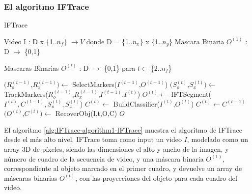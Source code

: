 \subsubsection{El algoritmo IFTrace}
\begin{algorithm}
    \caption{IFTrace}
    \label{alg:IFTrace-algorithm1-IFTrace}
    \begin{algorithmic}
        \Require\hspace{\algorithmicindent}\hspace{\algorithmicindent}Video I : D x \{1..$n_{f}$\} $\to V$
        \State\hspace{\algorithmicindent}\hspace{\algorithmicindent}\hspace{\algorithmicindent}\hspace{0.3cm}donde D = \{1..$n_{x}$\} x \{1..$n_{y}$\}
        \State\hspace{\algorithmicindent}\hspace{\algorithmicindent}\hspace{\algorithmicindent}\hspace{0.3cm}Mascara Binaria $O^{(1)}$ : D $\to$ \{0,1\}

        \Ensure \hspace{\algorithmicindent}\hspace{0.23cm} Mascaras Binarias $O^{(t)}$ : D $\to$ \{0,1\} para $t \in $ \{2..$n_f$\}
        \State

            \State $(R^{(t-1)}_{o}$,$R^{(t-1)}_{x}) \gets $  SelectMarkers($I^{(t-1)}$,$O^{(t-1)}$)
            \State $(S^{(t)}_{o}$,$S^{(t)}_{x}) \gets$  TrackMarkers($R^{(t-1)}_{o}$,$R^{(t-1)}_{x}$,$I^{(t-1)}$,$I^{(t)}$)
                \State $O^{(t)} \gets$  IFTSegment($I^{(t)}, C^{(t-1)}, S^{(t)}_{o}, S^{(t)}_{x}$)
                \State$C^{(t)} \gets$ BuildClassifier($I^{(t)}$,$O^{(t)}$)
            \Else
                \State $C^{(t)} \gets C^{(t-1)}$
                \State $(O^{(t)}$,$C^{(t)}) \gets$  RecoverObj(I,t,O,C)
            \EndIf\EndFor
        \State \Return $O$
    \end{algorithmic}
\end{algorithm}

El algoritmo \ref{alg:IFTrace-algorithm1-IFTrace} muestra el algoritmo de IFTrace
desde el más alto nivel. IFTrace toma como input un video $I$, modelado como un
array 3D de píxeles, siendo las dimensiones el alto y ancho de la imagen, y
número de cuadro de la secuencia de video, y una máscara binaria $O^{(1)}$,
correspondiente al objeto marcado en el primer cuadro, y devuelve un array de
máscaras binarias $O^{(t)}$, con las proyecciones del objeto para cada cuadro
del video.

